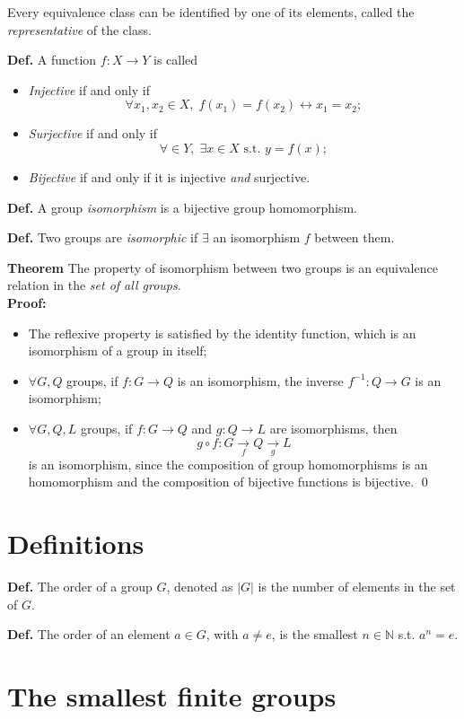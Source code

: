 Every equivalence class can be identified by one of its elements, called the
\textit{representative} of the class.

\textbf{Def.} A function $f:X\rightarrow Y$ is called
\begin{itemize}
    \item \textit{Injective} if and only if
	$$\forall x_1,x_2\in X,\;f(x_1)=f(x_2)\leftrightarrow x_1=x_2;$$
    \item \textit{Surjective} if and only if
	$$\forall \in Y,\;\exists x\in X \text{ s.t. } y = f(x);$$
    \item \textit{Bijective} if and only if it is injective \textit{and} surjective.
\end{itemize}

\textbf{Def.} A group \textit{isomorphism} is a bijective group homomorphism.

\textbf{Def.} Two groups are \textit{isomorphic} if $\exists$ an isomorphism $f$
between them.

\textbf{Theorem} The property of isomorphism between two groups is an equivalence
relation in the \textit{set of all groups}.\\
\textbf{Proof:}
\begin{itemize}
    \item The reflexive property is satisfied by the identity function, which is
an isomorphism of a group in itself;
    \item $\forall G,Q$ groups, if $f: G\rightarrow Q$ is an isomorphism, the inverse
    $f^{-1}:Q\rightarrow G$ is an isomorphism;
\item $\forall G,Q,L$ groups, if $f:G\rightarrow Q$ and $g:Q\rightarrow L$ are
    isomorphisms, then
    $$g\circ f: G \underset{f}\rightarrow Q \underset{g}\rightarrow L$$
    is an isomorphism, since the composition of group homomorphisms is an homomorphism
    and the composition of bijective functions is bijective. \qed
\end{itemize}
\section{Definitions}
\textbf{Def.} The order of a group $G$, denoted as $|G|$ is the number of elements
in the set of $G$.

\textbf{Def.} The order of an element $a\in G$, with $a\neq e$, is the smallest
$n\in\mathbb{N}$ s.t. $a^n=e$.

\section{The smallest finite groups}
